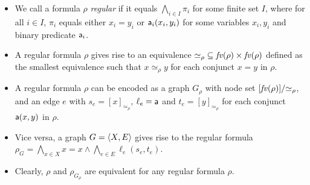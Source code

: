 \begin{itemize}
\item We call a formula $\rho$ \emph{regular} if it equals $\bigwedge_{i\in I} \pi_i$ for some finite set $I$, where for all $i\in I$, $\pi_i$ equals either $x_i=y_i$ or $\mathsf{a}_i(x_i,y_i)$ for some variables $x_i,y_i$ and binary predicate $\mathsf{a}_i$.

\item A regular formula $\rho$ gives rise to an equivalence ${\simeq_\rho}\subseteq \mathit{fv}(\rho)\times \mathit{fv}(\rho)$ defined as the smallest equivalence such that $x\simeq_\rho y$ for each conjunct $x=y$ in $\rho$.

\item A regular formula $\rho$ can be encoded as a graph $G_\rho$ with node set $[\mathit{fv}(\rho)]/{\simeq_\rho}$, and an edge $e$ with $s_e=[x]_{\simeq_\rho}$, $\ell_e=\mathsf{a}$ and $t_e=[y]_{\simeq_\rho}$ for each conjunct $\mathsf{a}(x,y)$ in $\rho$.

\item Vice versa, a graph $G=\langle{X,E}\rangle$ gives rise to the regular formula $\rho_G=\bigwedge_{x\in X} x=x \wedge \bigwedge_{e\in E} \ell_e(s_e,t_e)$.

\item Clearly, $\rho$ and $\rho_{G_\rho}$ are equivalent for any regular formula $\rho$.
\end{itemize}



